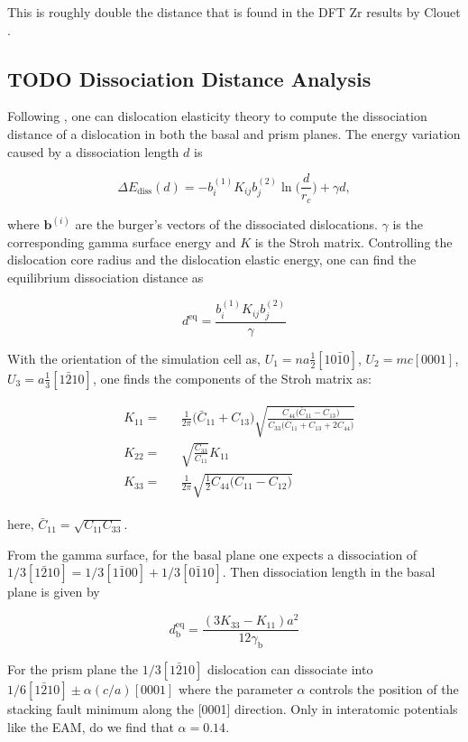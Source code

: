 \documentclass[11pt]{article}
\begin{document}
This is roughly double the distance that is found in the DFT Zr
results by Clouet \cite{Clouet2012}.

\subsection{{\bfseries\sffamily TODO} Dissociation Distance Analysis}
\label{sec:org0e29d56}
Following \cite{Clouet2012}, one can dislocation elasticity theory to
compute the dissociation distance of a dislocation in both the
basal and prism planes.  The energy variation caused by a
dissociation length \(d\) is

\[ \Delta E_{\text{diss}}(d) = - b_i^{(1)}K_{ij}b_j^{(2)}\ln \big( \frac{d}{r_c}
   \big) + \gamma d,  \]

where \(\mathbf{b}^{(i)}\) are the burger's vectors of the dissociated
dislocations.  \(\gamma\) is the corresponding gamma surface energy and
\(K\) is the Stroh matrix. Controlling the dislocation core radius
and the dislocation elastic energy, one can find the equilibrium
dissociation distance as 

\[
   d^{\text{eq}} = \frac{ b_i^{(1)}K_{ij}b_j^{(2) }}{\gamma}
   \]


With the orientation of the simulation cell as, \(U_1 = na \frac{1}{2} [10\bar{1}0]\), \(U_2 = mc [0001]\), 
 \(U_3 =  a \frac{1}{3} [1\bar{2}10]\), one finds the components of
 the Stroh matrix as:

\begin{align}
&K_{11} =& &\frac{1}{2\pi} \big( \bar{C}_{11} + C_{13} \big)
      \sqrt{ \frac{ C_{44} \big( \bar{C}_{11} - C_{13} \big)  }{
	      C_{33} \big( \bar{C}_{11} + C_{13} + 2C_{44} \big)  } 
	   }
\\    
&K_{22 }=& &\sqrt{ \frac{ C_{33} }{ C_{11} }  } K_{11}
\\
&K_{33} =& &\frac{1}{2\pi} \sqrt{ \frac{1}{2} C_{44} \big( C_{11} - C_{12} \big)  }_{}
\end{align}

here, \(\bar{C}_{11} = \sqrt{ C_{11}C_{33} }\).


From the gamma surface, for the basal plane one expects a
dissociation of \(1/3[1\bar{2}10] = 1/3[1\bar{1}00] +
    1/3[0\bar{1}10]\). Then dissociation length in the basal plane is
given by 

\[
    d_{\text{b}}^{\text{eq}} = \frac{ ( 3K_{33} - K_{11} ) a^2 }{ 12 \gamma_{\text{b}} } 
    \]

For the prism plane the \(1/3[1\bar{2}10]\) dislocation can
dissociate into \(1/6[1\bar{2}10] \pm \alpha(c/a)[0001]\) where the
parameter \(\alpha\) controls the position of the stacking fault minimum
along the [0001] direction. Only in interatomic potentials like
the EAM, do we find that \(\alpha = 0.14\). 
\end{document}
